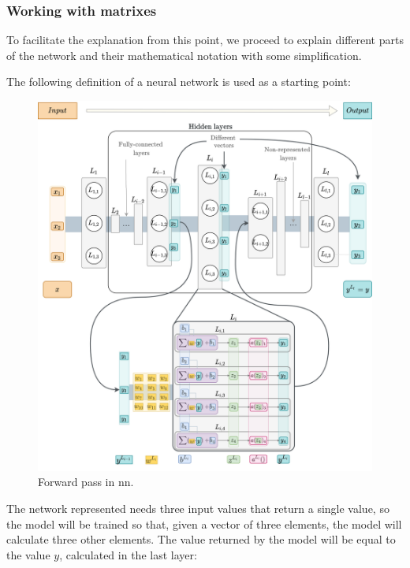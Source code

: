 \subsubsection{Working with matrixes}\label{workingwithmatrixes}
To facilitate the explanation from this point, we proceed to explain different parts of the network and their mathematical notation with some simplification.
\newline

The following definition of a neural network is used as a starting point:


\begin{figure}[H]
    \centering
    \includegraphics[width=16cm]{images/state-of-art/matrixes/layer_activation_representation.png}
    \caption{Forward pass in \acrshort{nn}.}
    \label{fig:basic_network51}
\end{figure}

The network represented needs three input values that return a single value, so the model will be trained so that, given a vector of three elements, the model will calculate three other elements. The value returned by the model will be equal to the value $y$, calculated in the last layer:

